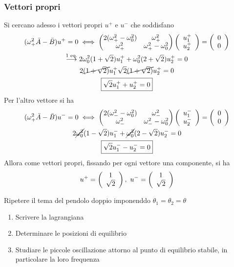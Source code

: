 \documentclass[Main.tex]{subfiles}
\begin{document}
\begin{tema}
\subsubsection*{Vettori propri}
Si cercano adesso i vettori propri $u^+ $ e $u^-$ che soddisfano
\begin{gather} 
	( \omega_+ ^2 \bar A - \bar B ) u^+ =0 \iff \left( \begin{matrix}
 	2(\omega_+^2- \omega_0^2) & \omega_+^2 \\ \omega_+^2 & \omega_+^2 - \omega_0^2
 \end{matrix} \right) \vec{ u_1^+ \\ u_2^+} = \vec{0 \\ 0}\notag  \\
 \overset{\text{1 eq.}}{\longrightarrow} 2 \omega_0^2 (1+ \sqrt{2} ) u_1^+ + \omega_0^2 ( 2+ \sqrt{2} ) u_2^+=0\\
 2\cancel{ (1+ \sqrt{2} )}u^+_1  \sqrt{2} \cancel{ (1+ \sqrt{2} )} u_2^+ =0\\
 	\boxed{\sqrt{2} u_1^+ + u_2^+=0}
\end{gather}
Per l'altro vettore si ha
\begin{gather}
	( \omega_+ ^2 \bar A - \bar B ) u^- =0 \iff \left( \begin{matrix}
 	2(\omega_-^2- \omega_0^2) & \omega_-^2 \\ \omega_-^2 & \omega_-^2 - \omega_0^2
 \end{matrix} \right) \vec{ u_1^- \\ u_2^-} = \vec{0 \\ 0}\notag  \\
	2 \cancel{\omega_0^2} (1- \sqrt{2}) u_1^- + \cancel{\omega_0^2} (2- \sqrt{2}) u_2^- =0\\
	\boxed{\sqrt{2} u_1^- - u_2^-=0}
\end{gather}
Allora come vettori propri, fissando per ogni vettore una componente, si ha
\begin{gather}
	u^+ = \vec{ 1 \\ \sqrt{2} }, \ u^- = \vec{1 \\ \sqrt{2}}
\end{gather}
	
\end{tema}


\begin{esercizio}
	Ripetere il tema del pendolo doppio imponenddo $\theta_1=\theta_2 = \theta$
	\begin{enumerate}
		\item Scrivere la lagrangiana
		\item Determinare le posizioni di equilibrio
		\item Studiare le piccole oscillazione attorno al punto di equilibrio stabile, in particolare la loro frequenza
	\end{enumerate}
\end{esercizio}
\end{document}
